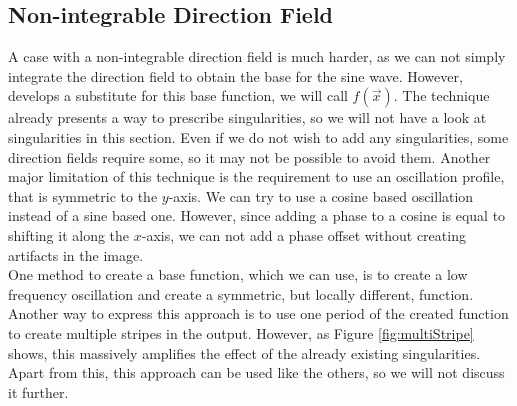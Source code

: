 \documentclass{utue} %
\begin{document}
\subsection{Non-integrable Direction Field}\label{sec:stripes}
A case with a non-integrable direction field is much harder, as we can not simply integrate the direction field to obtain the base for the sine wave. However, \cite{stripes} develops a substitute for this base function, we will call $f(\vec{x})$. The technique already presents a way to prescribe singularities, so we will not have a look at singularities in this section. Even if we do not wish to add any singularities, some direction fields require some, so it may not be possible to avoid them. Another major limitation of this technique is the requirement to use an oscillation profile, that is symmetric to the $y$-axis. We can try to use a cosine based oscillation instead of a sine based one. However, since adding a phase to a cosine is equal to shifting it along the $x$-axis, we can not add a phase offset without creating artifacts in the image.\\
One method to create a base function, which we can use, is to create a low frequency oscillation and create a symmetric, but locally different, function. Another way to express this approach is to use one period of the created function to create multiple stripes in the output. However, as Figure \ref{fig:multiStripe} shows, this massively amplifies the effect of the already existing singularities. Apart from this, this approach can be used like the others, so we will not discuss it further.
\end{document}

